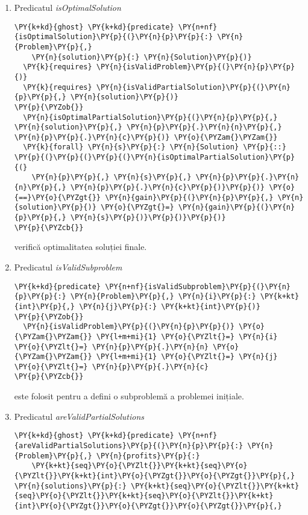 \begin{enumerate}
    \item Predicatul \textit{isOptimalSolution}
\begin{Verbatim}[commandchars=\\\{\}]
\PY{k+kd}{ghost} \PY{k+kd}{predicate} \PY{n+nf}{isOptimalSolution}\PY{p}{(}\PY{n}{p}\PY{p}{:} \PY{n}{Problem}\PY{p}{,} 
    \PY{n}{solution}\PY{p}{:} \PY{n}{Solution}\PY{p}{)}
  \PY{k}{requires} \PY{n}{isValidProblem}\PY{p}{(}\PY{n}{p}\PY{p}{)}
  \PY{k}{requires} \PY{n}{isValidPartialSolution}\PY{p}{(}\PY{n}{p}\PY{p}{,} \PY{n}{solution}\PY{p}{)}
\PY{p}{\PYZob{}}
  \PY{n}{isOptimalPartialSolution}\PY{p}{(}\PY{n}{p}\PY{p}{,} \PY{n}{solution}\PY{p}{,} \PY{n}{p}\PY{p}{.}\PY{n}{n}\PY{p}{,} \PY{n}{p}\PY{p}{.}\PY{n}{c}\PY{p}{)} \PY{o}{\PYZam{}\PYZam{}}
  \PY{k}{forall} \PY{n}{s}\PY{p}{:} \PY{n}{Solution} \PY{p}{::} \PY{p}{(}\PY{p}{(}\PY{p}{(}\PY{n}{isOptimalPartialSolution}\PY{p}{(}
    \PY{n}{p}\PY{p}{,} \PY{n}{s}\PY{p}{,} \PY{n}{p}\PY{p}{.}\PY{n}{n}\PY{p}{,} \PY{n}{p}\PY{p}{.}\PY{n}{c}\PY{p}{)}\PY{p}{)} \PY{o}{==}\PY{o}{\PYZgt{}} \PY{n}{gain}\PY{p}{(}\PY{n}{p}\PY{p}{,} \PY{n}{solution}\PY{p}{)} \PY{o}{\PYZgt{}=} \PY{n}{gain}\PY{p}{(}\PY{n}{p}\PY{p}{,} \PY{n}{s}\PY{p}{)}\PY{p}{)}\PY{p}{)}
\PY{p}{\PYZcb{}}
\end{Verbatim}
    verifică optimalitatea soluției finale.
    \item Predicatul \textit{isValidSubproblem}
    \begin{Verbatim}[commandchars=\\\{\}]
\PY{k+kd}{predicate} \PY{n+nf}{isValidSubproblem}\PY{p}{(}\PY{n}{p}\PY{p}{:} \PY{n}{Problem}\PY{p}{,} \PY{n}{i}\PY{p}{:} \PY{k+kt}{int}\PY{p}{,} \PY{n}{j}\PY{p}{:} \PY{k+kt}{int}\PY{p}{)}
\PY{p}{\PYZob{}}
  \PY{n}{isValidProblem}\PY{p}{(}\PY{n}{p}\PY{p}{)} \PY{o}{\PYZam{}\PYZam{}} \PY{l+m+mi}{1} \PY{o}{\PYZlt{}=} \PY{n}{i} \PY{o}{\PYZlt{}=} \PY{n}{p}\PY{p}{.}\PY{n}{n} \PY{o}{\PYZam{}\PYZam{}} \PY{l+m+mi}{1} \PY{o}{\PYZlt{}=} \PY{n}{j} \PY{o}{\PYZlt{}=} \PY{n}{p}\PY{p}{.}\PY{n}{c} 
\PY{p}{\PYZcb{}}
\end{Verbatim}
    este folosit pentru a defini o subproblemă a problemei inițiale.
    \item Predicatul \textit{areValidPartialSolutions}
    \begin{Verbatim}[commandchars=\\\{\}]
\PY{k+kd}{ghost} \PY{k+kd}{predicate} \PY{n+nf}{areValidPartialSolutions}\PY{p}{(}\PY{n}{p}\PY{p}{:} \PY{n}{Problem}\PY{p}{,} \PY{n}{profits}\PY{p}{:} 
    \PY{k+kt}{seq}\PY{o}{\PYZlt{}}\PY{k+kt}{seq}\PY{o}{\PYZlt{}}\PY{k+kt}{int}\PY{o}{\PYZgt{}}\PY{o}{\PYZgt{}}\PY{p}{,} \PY{n}{solutions}\PY{p}{:} \PY{k+kt}{seq}\PY{o}{\PYZlt{}}\PY{k+kt}{seq}\PY{o}{\PYZlt{}}\PY{k+kt}{seq}\PY{o}{\PYZlt{}}\PY{k+kt}{int}\PY{o}{\PYZgt{}}\PY{o}{\PYZgt{}}\PY{o}{\PYZgt{}}\PY{p}{,} 

\end{Verbatim}
\end{enumerate}
